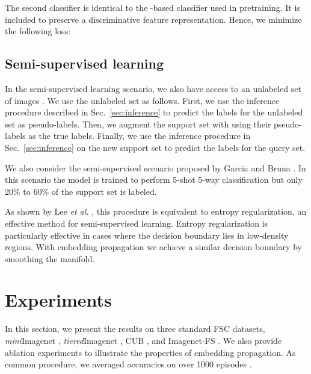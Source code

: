 \documentclass[runningheads]{llncs}
\begin{document}
The second classifier is identical to the -based classifier used in pretraining.
It is included to preserve a discriminative feature representation.
Hence, we minimize the following loss:




\subsection{Semi-supervised learning}\label{sec:method-semisup}
In the semi-supervised learning scenario, we also have access to an unlabeled set of images . We use the unlabeled set as follows. First, we use the inference procedure described in Sec.~\ref{sec:inference} to predict the labels  for the unlabeled set as pseudo-labels. Then, we augment the support set with  using their pseudo-labels as the true labels. Finally, we use the inference procedure in Sec.~\ref{sec:inference} on the new support set to predict the labels for the query set.

We also consider the semi-supervised scenario proposed by Garcia and Bruna \cite{garcia2017few}. In this scenario the model is trained to perform 5-shot 5-way classification but only 20\% to 60\% of the support set is labeled.

As shown by Lee \emph{et al.} \cite{lee2013pseudo}, this procedure is equivalent to entropy regularization, an effective method for semi-supervised learning. Entropy regularization is particularly effective in cases where the decision boundary lies in low-density regions. With embedding propagation we achieve a similar decision boundary by smoothing the manifold.


\section{Experiments}
\label{sec:experimental_setup}
In this section, we present the results on three standard FSC datasets, \textit{mini}Imagenet \cite{vinyals2016matching}, \textit{tiered}Imagenet \cite{ren2018metalearning}, CUB \cite{WelinderEtal2010}, and Imagenet-FS \cite{hariharan2017low}. We also provide ablation experiments to illustrate the properties of embedding propagation. As common procedure, we averaged accuracies on  over 1000 episodes \cite{vinyals2016matching}.   
\end{document}
